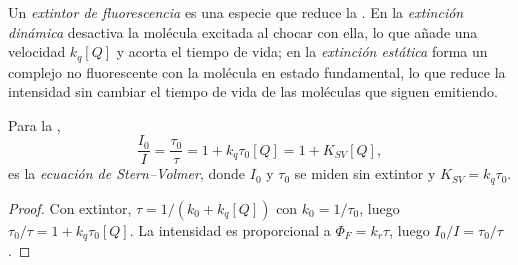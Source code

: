 \begin{definition}\label{def:b3:electronic-spectroscopy:quencher}
Un \emph{extintor de fluorescencia} es una especie que
reduce la . En la \emph{extinción dinámica}
desactiva la molécula excitada al chocar con ella, lo que añade una velocidad $k_q[Q]$ y
acorta el tiempo de vida; en la \emph{extinción estática}
forma un complejo no fluorescente con la molécula en estado fundamental, lo que reduce la
intensidad sin cambiar el tiempo de vida de las moléculas que siguen emitiendo.
\end{definition}

\begin{theorem}\label{thm:b3:electronic-spectroscopy:stern-volmer}
Para la ,
\[
\frac{I_0}{I} = \frac{\tau_0}{\tau} = 1 + k_q\tau_0[Q] = 1 + K_{SV}[Q],
\]
es la \emph{ecuación de Stern--Volmer}, donde $I_0$ y $\tau_0$
se miden sin extintor y $K_{SV} = k_q\tau_0$.
\end{theorem}

\begin{proof}
Con extintor, $\tau = 1/(k_0 + k_q[Q])$ con $k_0 = 1/\tau_0$, luego $\tau_0/\tau = 1 +
k_q\tau_0[Q]$. La intensidad es proporcional a $\Phi_F = k_r\tau$, luego $I_0/I = \tau_0/\tau$.
\end{proof}

